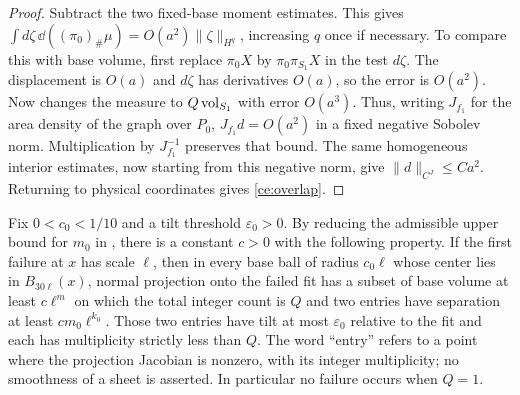 \begin{proof}
Subtract the two fixed-base moment estimates.  This gives
$\int d\zeta\,\dd((\pi_0)_\#\mu)=O(a^2)\|\zeta\|_{H^q}$,
increasing $q$ once if necessary.  To compare this with base volume,
first replace $\pi_0X$ by $\pi_0\pi_{S_1}X$ in the test $d\zeta$.
The displacement is $O(a)$ and $d\zeta$ has derivatives $O(a)$, so
the error is $O(a^2)$.  Now  changes the measure to
$Q\operatorname{vol}_{S_1}$ with error $O(a^3)$.  Thus, writing $J_{f_1}$ for the
area density of the graph over $P_0$,
$J_{f_1}d=O(a^2)$ in a fixed negative Sobolev norm.  Multiplication by
$J_{f_1}^{-1}$ preserves that bound.  The same homogeneous interior
estimates, now starting from this negative norm, give
$\|d\|_{C^J}\le Ca^2$.  Returning to physical coordinates gives
\eqref{ce:overlap}.
\end{proof}

\newpage
\begin{lemma}
 \label{ce:failed}
Fix $0<c_0<1/10$ and a tilt threshold $\varepsilon_0>0$.  By reducing
the admissible upper bound for $m_0$ in , there is a
constant $c>0$ with the following property.  If the first failure at
$x$ has scale $\ell$, then in every base ball of radius $c_0\ell$
whose center lies in $B_{30\ell}(x)$, normal projection onto the failed
fit has a subset of base volume at least $c\ell^m$ on which the total
integer count is $Q$ and two entries have separation at least
$c m_0\ell^{k_0}$.  Those two entries have tilt at most
$\varepsilon_0$ relative to the fit and each has multiplicity strictly
less than $Q$.  The word ``entry'' refers to a point where the
projection Jacobian is nonzero, with its integer multiplicity; no
smoothness of a sheet is asserted.  In particular no failure occurs
when $Q=1$.
\end{lemma}

